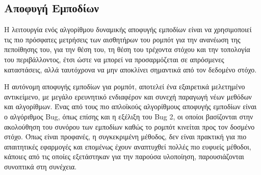 \subsection{Αποφυγή Εμποδίων} \label{ssec:obstacle_avoidance}
Η λειτουργία ενός αλγορίθμου δυναμικής αποφυγής εμποδίων είναι να χρησιμοποιεί τις πιο πρόσφατες μετρήσεις των αισθητήρων του ρομπότ για την ανανέωση της πεποίθησης του, για την θέση του, τη θέση του τρέχοντα στόχου και την τοπολογία του περιβάλλοντος, έτσι ώστε να μπορεί να προσαρμόζεται σε απρόσμενες καταστάσεις, αλλά ταυτόχρονα να μην αποκλίνει σημαντικά από τον δεδομένο στόχο.

\bigskip
Η αυτόνομη αποφυγής εμποδίων για ρομπότ, αποτελεί ένα εξαιρετικά μελετημένο αντικείμενο, με μεγάλο ερευνητικό ενδιαφέρον και συνεχή παραγωγή νέων μεθόδων και αλγορίθμων. Ένας από τους πιο απλοϊκούς αλγορίθμους αποφυγής εμποδίων είναι ο αλγόριθμος Bug, όπως επίσης και η εξέλιξη του Bug 2, οι οποίοι βασίζονται στην ακολούθηση του συνόρου των εμποδίων καθώς το ρομπότ κινείται προς τον δοσμένο στόχο. Όπως είναι προφανές, η συγκεκριμένη μέθοδος, δεν είναι πρακτική για πιο απαιτητικές εφαρμογές και επομένως έχουν αναπτυχθεί πολλές πιο ευφυείς μέθοδοι, κάποιες από τις οποίες εξετάστηκαν για την παρούσα υλοποίηση, παρουσιάζονται συνοπτικά στη συνέχεια.

